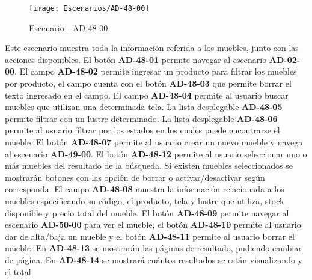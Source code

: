 \begin{figure}[H]
\centering
\texttt{[image: Escenarios/AD-48-00]}
\caption{Escenario - AD-48-00}
\label{fig:AD-48-00}
\end{figure}

Este escenario muestra toda la información referida a los muebles, junto con las acciones disponibles.
El botón \textbf{AD-48-01} permite navegar al escenario \textbf{AD-02-00}. El campo \textbf{AD-48-02} permite ingresar un producto para filtrar los muebles por producto, el campo cuenta con el botón \textbf{AD-48-03} que permite borrar el texto ingresado en el campo. El campo \textbf{AD-48-04} permite al usuario buscar muebles que utilizan una determinada tela. La lista desplegable \textbf{AD-48-05} permite filtrar con un lustre determinado. La lista desplegable \textbf{AD-48-06} permite al usuario filtrar por los estados en los cuales puede encontrarse el mueble.
El botón \textbf{AD-48-07} permite al usuario crear un nuevo mueble y navega al escenario \textbf{AD-49-00}.
El botón \textbf{AD-48-12} permite al usuario seleccionar uno o más muebles del resultado de la búsqueda. Si existen muebles seleccionados se mostrarán botones con las opción de borrar o activar/desactivar según corresponda. El campo \textbf{AD-48-08} muestra la información relacionada a los muebles especificando su código, el producto, tela y lustre que utiliza, stock disponible y precio total del mueble. El botón \textbf{AD-48-09} permite navegar al escenario \textbf{AD-50-00} para ver el mueble, el botón \textbf{AD-48-10} permite al usuario dar de alta/baja un mueble y el botón \textbf{AD-48-11} permite al usuario borrar el mueble. 
En \textbf{AD-48-13} se mostrarán las páginas de resultado, pudiendo cambiar de página. En \textbf{AD-48-14} se mostrará cuántos resultados se están visualizando y el total.
\clearpage
